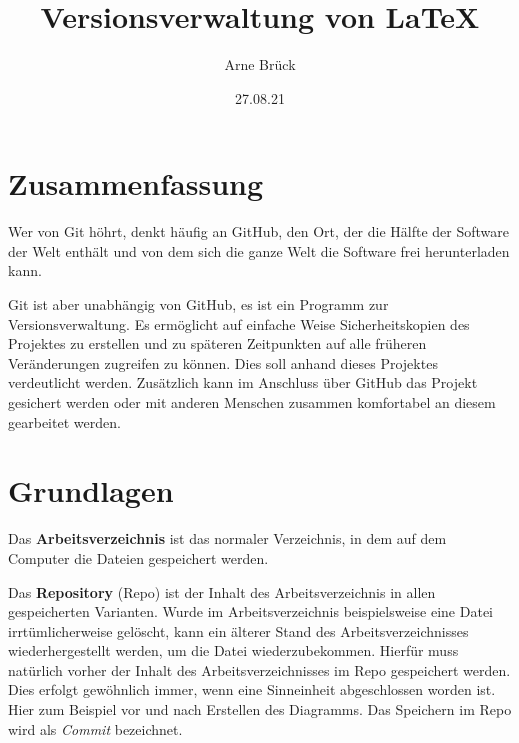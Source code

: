\documentclass[11pt]{article}
\title{Versionsverwaltung von \LaTeX{}}
\author{Arne Brück}
\date{27.08.21}
\begin{document}
\maketitle

\section{Zusammenfassung}
Wer von Git höhrt, denkt häufig an GitHub, den Ort, der die Hälfte der
Software der Welt enthält und von dem sich die ganze Welt die Software
frei herunterladen kann.

Git ist aber unabhängig von GitHub, es ist ein Programm zur
Versionsverwaltung. Es ermöglicht auf einfache Weise Sicherheitskopien
des Projektes zu erstellen und zu späteren Zeitpunkten auf alle
früheren Veränderungen zugreifen zu können. Dies soll anhand dieses
Projektes verdeutlicht werden. Zusätzlich kann im Anschluss über
GitHub das Projekt gesichert werden oder mit anderen Menschen zusammen
komfortabel an diesem gearbeitet werden.

\section{Grundlagen}


Das \textbf{Arbeitsverzeichnis} ist das normaler Verzeichnis, in dem auf dem
Computer die Dateien gespeichert werden.

Das \textbf{Repository} (Repo) ist der Inhalt des Arbeitsverzeichnis in allen
gespeicherten Varianten. Wurde im Arbeitsverzeichnis beispielsweise
eine Datei irrtümlicherweise gelöscht, kann ein älterer Stand des
Arbeitsverzeichnisses wiederhergestellt werden, um die Datei
wiederzubekommen. Hierfür muss natürlich vorher der Inhalt des
Arbeitsverzeichnisses im Repo gespeichert werden. Dies erfolgt
gewöhnlich immer, wenn eine Sinneinheit abgeschlossen worden ist. Hier
zum Beispiel vor und nach Erstellen des Diagramms. Das Speichern im
Repo wird als \textsl{Commit} bezeichnet.
\end{document}
